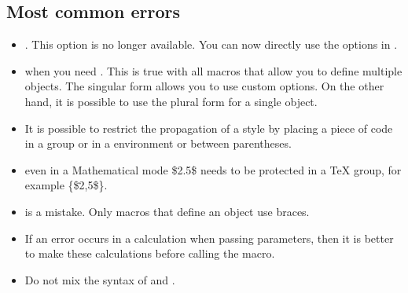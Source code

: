 \subsection{Most common errors}
 \begin{itemize}\setlength{\itemsep}{10pt}

\item {}. This option is no longer available. You can now directly use the options in \TIKZ.

 \item {} when you need . This is true with all macros that allow you to define multiple objects. The singular form allows you to use custom options. On the other hand, it is possible to use the plural form for a single object.


 \item {} It is possible to restrict the propagation of a style by placing a piece of code in a group or in a  environment or between parentheses.

 \item  {} even in a Mathematical mode \$2.5\$ needs to be protected in a TeX group, for example \{\$2,5\$\}.

\item  {} is a mistake. Only macros that define an object use braces.
  \item If an error occurs in a calculation when passing parameters, then it is better to make these calculations before calling the macro.
  \item Do not mix the syntax of  and .
 \end{itemize}

\endinput
